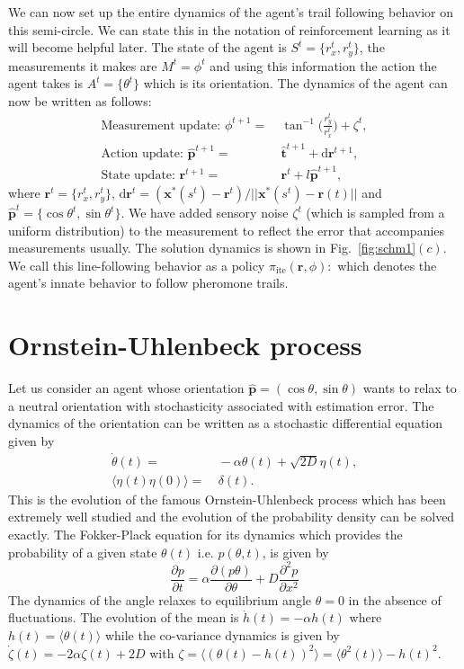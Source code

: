 \documentclass[12pt]{article}
\def\d{\text{d}}
\def\r{\mathbf{r}}
\def\xst{\mathbf{x}^*}
\def\th{\hat{\mathbf{t}}}
\def\ph{\hat{\mathbf{p}}}
\def\ite{\text{ite}}
\begin{document}
We can now set up the entire dynamics of the agent's trail following behavior on this semi-circle. We can state this
in the notation of reinforcement learning as it will become helpful later. The state of the agent
is $S^t = \{ r_x^t, r_y^t \}$, the measurements it makes are $M^t = \phi^t$ and using this information
the action the agent takes is $A^t = \{ \theta^t \}$ which is its orientation. The dynamics of
the agent can now be written as follows:
\begin{align}
    \text{Measurement update: } \phi^{t+1} = & \ \tan^{-1} \bigg( \frac{r_y^t}{r_x^t} \bigg) + \zeta^t, \\
    \text{Action update: }\ph^{t+1} =& \ \th^{t+1} + \d\r^{t+1}, \\
    \text{State update: } \r^{t+1} =& \ \r^t + l \ph^{t+1},
\end{align}
where $\r^t = \{ r_x^t, r_y^t \}$, $\d\r^t = (\xst(s^t)-\r^t)/||\xst(s^t)-\r(t)||$ and $\ph^t = \{ \cos \theta^t, \sin \theta^t \}$.
We have added sensory noise $\zeta^t$ (which is sampled from a uniform distribution) to the measurement
to reflect the error that accompanies measurements usually. The solution dynamics is shown
in Fig.~\ref{fig:schm1}$(c)$. We call this line-following behavior as a policy
$\pi_\ite(\r, \phi): $
which denotes the agent's innate behavior to follow pheromone trails.

\section{Ornstein-Uhlenbeck process}

Let us consider an agent whose orientation $\ph = ( \cos \theta, \sin \theta)$ wants to relax to a
neutral orientation with stochasticity associated with estimation error. The dynamics of the orientation
can be written as a stochastic differential equation given by
\begin{align}
    \dot{\theta}(t) =& \ - \alpha \theta(t) + \sqrt{2 D} \eta(t), \\
    \langle \eta(t) \eta(0) \rangle =& \ \delta(t).
\end{align}
This is the evolution of the famous Ornstein-Uhlenbeck process which has been extremely well studied
and the evolution of the probability density can be solved exactly. The Fokker-Plack equation for
its dynamics which provides the probability of a given state $\theta(t)$ i.e. $p(\theta, t)$, is given by
\[
    \frac{\partial p}{\partial t} = \alpha \frac{\partial(p \theta)}{\partial \theta }
    + D \frac{\partial^2 p}{\partial x^2}
\]
The dynamics of the angle relaxes to equilibrium angle $\theta = 0$ in the absence of fluctuations.
The evolution of the mean is $\dot{h}(t) = - \alpha h(t)$ where $h(t) = \langle \theta(t) \rangle$
while the co-variance dynamics is given by $\dot{\zeta}(t) = -2\alpha \zeta(t) + 2D$ with
$\zeta = \langle (\theta(t) - h(t))^2 \rangle = \langle \theta^2(t) \rangle - h(t)^2$.
\end{document}
